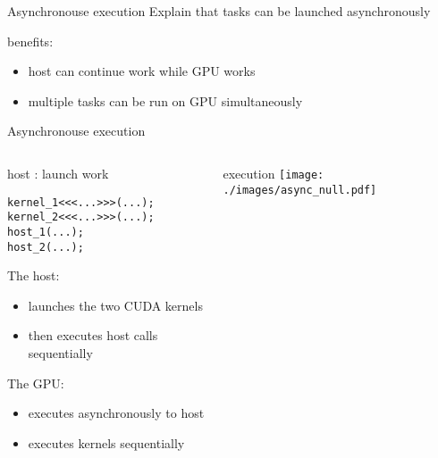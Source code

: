 
\begin{frame}[fragile]{Asynchronouse execution}
    Explain that tasks can be launched asynchronously

    benefits:
    \begin{itemize}
        \item host can continue work while GPU works
        \item multiple tasks can be run on GPU simultaneously
    \end{itemize}

\end{frame}

\begin{frame}[fragile]{Asynchronouse execution}
    \begin{columns}[T]
        \begin{column}{0.5\textwidth}
            \begin{codecolumn}{host : launch work}
        \begin{lstlisting}[style=boxcudatiny]
kernel_1<<<...>>>(...);
kernel_2<<<...>>>(...);
host_1(...);
host_2(...);
        \end{lstlisting}
            \end{codecolumn}
        The host:
        \begin{itemize}
            \item launches the two CUDA kernels
            \item then executes host calls sequentially 
        \end{itemize}
        The GPU:
        \begin{itemize}
            \item executes asynchronously to host
            \item executes kernels sequentially
        \end{itemize}
        \end{column}
        \begin{column}{0.5\textwidth}
            \begin{info}{execution}
                \texttt{[image: ./images/async\_null.pdf]}
            \end{info}
        \end{column}
    \end{columns}
\end{frame}

